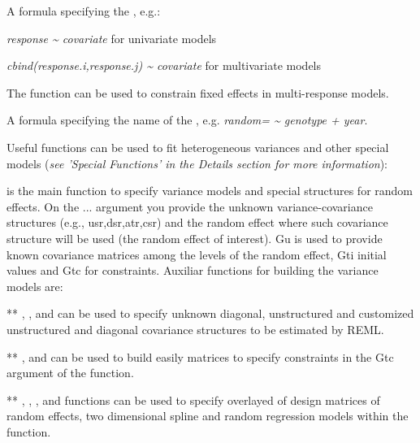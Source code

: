 \documentclass[a4paper]{book}
\begin{document}
\begin{Arguments}
\begin{ldescription}
\item[\code{fixed}] A formula specifying the  , e.g.:

\emph{response \textasciitilde{} covariate} for univariate models

\emph{cbind(response.i,response.j) \textasciitilde{} covariate} for multivariate models

The  function can be used to constrain fixed effects in multi-response models.



\item[\code{random}] A formula specifying the name of the , 
e.g. \emph{random= \textasciitilde{} genotype + year}.

Useful functions can be used to fit heterogeneous variances and other special
models (\emph{see 'Special Functions' in the Details section for more information}):

 is the main function to specify variance 
models and special structures for random effects. On the ... argument you
provide the unknown variance-covariance structures (e.g., usr,dsr,atr,csr)
and the random effect where such covariance structure will be used (the 
random effect of interest). Gu is used to provide known covariance matrices 
among the levels of the random effect, Gti initial values and Gtc for constraints. 
Auxiliar functions for building the variance models are:

** , ,  and
 can be used to specify unknown diagonal, 
unstructured and customized unstructured and diagonal covariance structures
to be estimated by REML.

** ,  and  
can be used to build easily matrices to specify constraints in the Gtc argument
of the  function.

** , , ,
and  functions can be used to specify overlayed 
of design matrices of random effects, two dimensional spline and random 
regression models within the  function.


\end{ldescription}
\end{Arguments}
\end{document}
